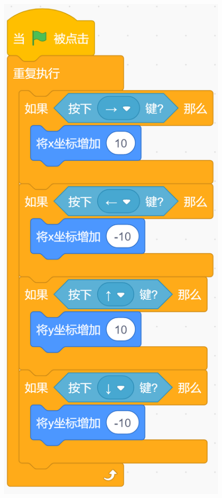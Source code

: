 \documentclass[10pt, a4paper]{article}
\begin{document}
\begin{enumerate}
\begin{figure}[htbp]
\begin{minipage}[t]{.15\textwidth}
                \includegraphics[width=\textwidth]{14.png}

\end{minipage}
\end{figure}
\end{enumerate}
\end{document}
